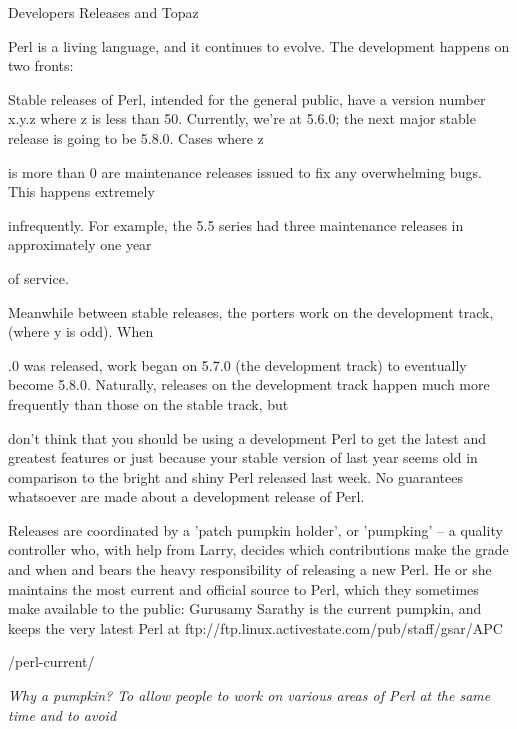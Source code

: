 \documentclass[a4paper,11pt]{book}
\begin{document}
\noindent 

\noindent Developers Releases and Topaz

\noindent 

\noindent Perl is a living language, and it continues to evolve. The development happens on two fronts:

\noindent 

\noindent Stable releases of Perl,  intended  for the  general  public,  have  a  version  number  x.y.z  where  z  is  less than 50.  Currently,  we're at  5.6.0;  the  next  major  stable  release  is  going  to  be  5.8.0.  Cases  where  z

\noindent is  more than 0 are maintenance  releases  issued  to  fix  any  overwhelming  bugs.  This  happens  extremely

\noindent infrequently.  For example,  the  5.5  series  had  three  maintenance  releases  in  approximately one year

\noindent of service.

\noindent 

\noindent 

\noindent Meanwhile between stable releases, the porters work on the development track, (where y is odd). When

.0 was released, work began on 5.7.0 (the development track) to eventually become 5.8.0. Naturally, releases on the development track happen much more frequently than those on the stable track, but

\noindent don't think that you should be using a development Perl to get the latest and greatest features or just because your stable version of last year seems old in comparison to the bright and shiny Perl released last week. No guarantees whatsoever are made about a development release of Perl.

\noindent 

\noindent Releases are coordinated by a 'patch pumpkin holder', or 'pumpking' -- a quality controller who, with help from Larry, decides which contributions make the grade and when and bears the heavy responsibility of releasing a new Perl. He or she maintains the most current and official source to Perl, which they sometimes make available to the public: Gurusamy Sarathy is the current pumpkin, and keeps the very latest Perl at ftp://ftp.linux.activestate.com/pub/staff/gsar/APC

\noindent /perl-current/

\noindent 

\noindent \textit{Why a pumpkin? To allow people to work on various areas of Perl at the same time and to avoid}
\end{document}

